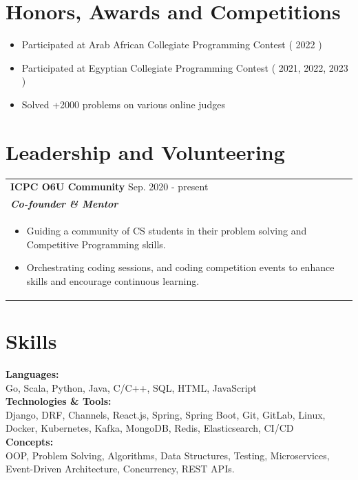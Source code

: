 \documentclass[a4paper,10pt]{article}
\begin{document}
    \section{Honors, Awards and Competitions}
    \begin{minipage}[t]{\linewidth}
        \begin{itemize}[nosep,after=\strut, leftmargin=2em, itemsep=2pt]
        \item Participated at Arab African Collegiate Programming Contest ( 2022 )
        \item Participated at Egyptian Collegiate Programming Contest ( 2021, 2022, 2023 )
        \item Solved +2000 problems on various online judges
        \end{itemize}
    \end{minipage}

    \section{Leadership and Volunteering}
    \begin{tabularx}{\linewidth}{ @{}l r@{} }
\color[HTML]{1C033C} \textbf{ICPC O6U Community} \hfill \color[HTML]{371e77} Sep. 2020 - present \\[5pt]
\color[HTML]{371e77}\textbf{\textit{Co-founder \& Mentor }} \\[5pt]
\begin{minipage}[t]{\linewidth}
    \begin{itemize}[nosep,after=\strut, leftmargin=2em, itemsep=2pt]
        \item Guiding a community of CS students in their problem solving and Competitive Programming skills.
        \item Orchestrating coding sessions, and coding competition events to enhance skills and encourage continuous learning.
    \end{itemize}
\end{minipage}
    \end{tabularx}

    \section{Skills}
    \color[HTML]{1C033C}\textbf{Languages:} \\[2pt]
    \color[HTML]{371e77} \hspace*{4ex} Go, Scala, Python, Java, C/C++, SQL, HTML, JavaScript \\[3pt]
    \color[HTML]{1C033C}\textbf{Technologies \& Tools:} \\[2pt]
    \color[HTML]{371e77} \hspace*{4ex} Django, DRF, Channels, React.js, Spring, Spring Boot, Git, GitLab, Linux, Docker, Kubernetes, Kafka, MongoDB, Redis, Elasticsearch, CI/CD \\[3pt]
    \color[HTML]{1C033C}\textbf{Concepts:} \\[2pt]
    \color[HTML]{371e77} \hspace*{4ex} OOP, Problem Solving, Algorithms, Data Structures, Testing, Microservices, Event-Driven Architecture, Concurrency, REST APIs.\\[3pt]
\end{document}
